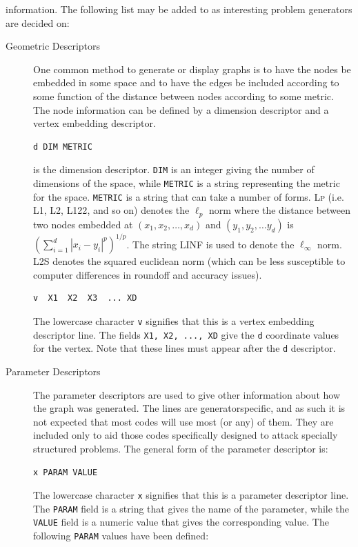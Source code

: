 \documentclass[a4paper,11pt]{report}
\begin{document}
{{{\begin{description}
information. The following list may be added to as interesting problem
generators are decided on: 
\begin{description}
\item[{Geometric Descriptors}]  One common method to generate or display graphs is to have the nodes be
embedded in some space and to have the edges be included according to some
function of the distance between nodes according to some metric. The node
information can be defined by a dimension descriptor and a vertex embedding
descriptor. 
\begin{Verbatim}[commandchars=!@|,fontsize=\small,frame=single,label=Example]
  d DIM METRIC
\end{Verbatim}
 is the dimension descriptor. \texttt{DIM} is an integer giving the number of dimensions of the space, while \texttt{METRIC} is a string representing the metric for the space. \texttt{METRIC} is a string that can take a number of forms. \textsc{Lp} (i.e. \textsc{L1}, \textsc{L2}, \textsc{L122}, and so on) denotes the $\ell_p$ norm where the distance between two nodes embedded at $(x_1,x_2,\ldots,x_d)$ and $(y_1,y_2,\ldots y_d)$ is $\left(\sum_{i=1}^d |x_i-y_i|^p \right)^{1/p}$. The string \textsc{LINF} is used to denote the $\ell_\infty$ norm. L2S denotes the squared euclidean norm (which can be less susceptible to
computer differences in round\texttt{}off and accuracy issues). 
\begin{Verbatim}[commandchars=!@|,fontsize=\small,frame=single,label=Example]
  v  X1  X2  X3  ... XD
\end{Verbatim}
 The lowercase character \texttt{v} signifies that this is a vertex embedding descriptor line. The fields \texttt{X1, X2, ..., XD} give the \texttt{d} coordinate values for the vertex. Note that these lines must appear after the \texttt{d} descriptor. 
\item[{Parameter Descriptors}]  The parameter descriptors are used to give other information about how the
graph was generated. The lines are generator\texttt{}specific, and
as such it is not expected that most codes will use most (or any) of them.
They are included only to aid those codes specifically designed to attack
specially structured problems. The general form of the parameter descriptor
is: 
\begin{Verbatim}[commandchars=!@|,fontsize=\small,frame=single,label=Example]
  x PARAM VALUE
\end{Verbatim}
 The lowercase character \texttt{x} signifies that this is a parameter descriptor line. The \texttt{PARAM} field is a string that gives the name of the parameter, while the \texttt{VALUE} field is a numeric value that gives the corresponding value. The following \texttt{PARAM} values have been defined: \begin{center}

\end{center}
\end{description}
\end{description}}}}
\end{document}
